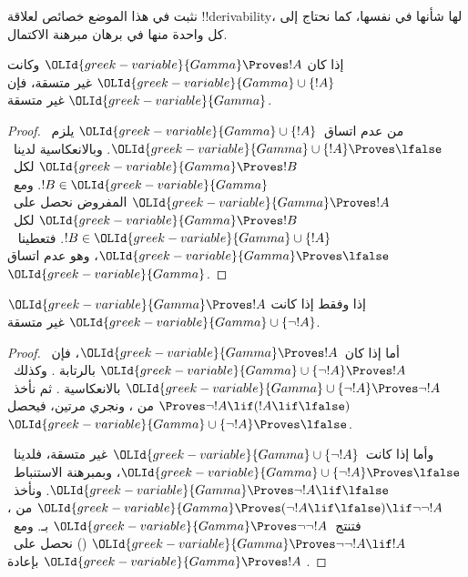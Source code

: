 \documentclass[../../../include/open-logic-section]{subfiles}
\begin{document}
      {}
      {}


نثبت في هذا الموضع خصائص لعلاقة !!{derivability}، لها شأنها في نفسها،
كما نحتاج إلى كل واحدة منها في برهان مبرهنة الاكتمال.

\begin{prop}
  إذا كان $\OLId{greek-variable}{Gamma} \Proves !A$ وكانت $\OLId{greek-variable}{Gamma} \cup \{!A\}$ غير متسقة،
  فإن $\OLId{greek-variable}{Gamma}$ غير متسقة.
\end{prop}

\begin{proof}
  من عدم اتساق~$\OLId{greek-variable}{Gamma} \cup \{!A\}$ يلزم~$\OLId{greek-variable}{Gamma} \cup \{!A\}
  \Proves \lfalse$. وبالانعكاسية 
  لدينا~$\OLId{greek-variable}{Gamma}
  \Proves !B$ لكل~$!B \in \OLId{greek-variable}{Gamma}$. ومع~$\OLId{greek-variable}{Gamma} \Proves !A$
  المفروض نحصل على~$\OLId{greek-variable}{Gamma} \Proves !B$ لكل~$!B \in \OLId{greek-variable}{Gamma} \cup
  \{!A\}$. فتعطينا ~$\OLId{greek-variable}{Gamma} \Proves
  \lfalse$، وهو عدم اتساق~$\OLId{greek-variable}{Gamma}$.
\end{proof}

\begin{prop}
$\OLId{greek-variable}{Gamma} \Proves !A$ إذا وفقط إذا كانت $\OLId{greek-variable}{Gamma} \cup \{\lnot !A\}$ غير متسقة.
\end{prop}

\begin{proof}
أما إذا كان~$\OLId{greek-variable}{Gamma} \Proves !A$، فإن~$\OLId{greek-variable}{Gamma} \cup \{\lnot !A\}
\Proves !A$ بالرتابة .
وكذلك~$\OLId{greek-variable}{Gamma} \cup
\{\lnot !A\} \Proves \lnot !A$ بالانعكاسية .
ثم نأخذ~$\Proves \lnot !A \lif (!A \lif \lfalse)$ من
، ونجري  مرتين،
فيحصل~$\OLId{greek-variable}{Gamma} \cup \{\lnot !A\} \Proves \lfalse$.

وأما إذا كانت~$\OLId{greek-variable}{Gamma} \cup \{\lnot !A\}$ غير متسقة، فلدينا~$\OLId{greek-variable}{Gamma}
\cup \{\lnot !A\} \Proves \lfalse$، وبمبرهنة الاستنباط~$\OLId{greek-variable}{Gamma}
\Proves \lnot !A \lif \lfalse$. ونأخذ~$\OLId{greek-variable}{Gamma} \Proves (\lnot !A
\lif \lfalse) \lif \lnot\lnot !A$ من ،
فتنتج~$\OLId{greek-variable}{Gamma} \Proves \lnot\lnot !A$ بـ.
ومع~$\OLId{greek-variable}{Gamma} \Proves \lnot\lnot !A \lif !A$ ()
نحصل على~$\OLId{greek-variable}{Gamma} \Proves !A$ بإعادة .
\end{proof}
\end{document}
